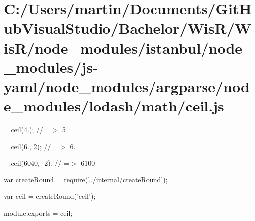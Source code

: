 \hypertarget{_c_1_2_users_2martin_2_documents_2_git_hub_visual_studio_2_bachelor_2_wis_r_2_wis_r_2node_module7f746c31aaf301e1ba0012ba43754df0}{}\section{C\+:/\+Users/martin/\+Documents/\+Git\+Hub\+Visual\+Studio/\+Bachelor/\+Wis\+R/\+Wis\+R/node\+\_\+modules/istanbul/node\+\_\+modules/js-\/yaml/node\+\_\+modules/argparse/node\+\_\+modules/lodash/math/ceil.\+js}
\+\_\+.\+ceil(4.); // =$>$ 5

\+\_\+.\+ceil(6., 2); // =$>$ 6.

\+\_\+.\+ceil(6040, -\/2); // =$>$ 6100


\begin{DoxyCodeInclude}
var createRound = require(\textcolor{stringliteral}{'../internal/createRound'});

var ceil = createRound(\textcolor{stringliteral}{'ceil'});

module.exports = ceil;
\end{DoxyCodeInclude}
 